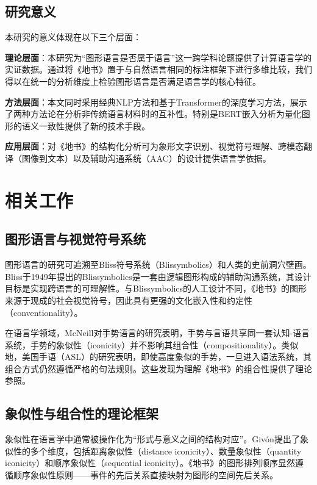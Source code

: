 \documentclass[a4paper,12pt]{article}
\begin{document}
\subsection{研究意义}

本研究的意义体现在以下三个层面：

\textbf{理论层面}：本研究为``图形语言是否属于语言''这一跨学科论题提供了计算语言学的实证数据。通过将《地书》置于与自然语言相同的标注框架下进行多维比较，我们得以在统一的分析维度上检验图形语言是否满足语言学的核心特征。

\textbf{方法层面}：本文同时采用经典NLP方法和基于Transformer的深度学习方法，展示了两种方法论在分析非传统语言材料时的互补性。特别是BERT嵌入分析为量化图形的语义一致性提供了新的技术手段。

\textbf{应用层面}：对《地书》的结构化分析可为象形文字识别、视觉符号理解、跨模态翻译（图像到文本）以及辅助沟通系统（AAC）的设计提供语言学依据。

\section{相关工作}\label{sec:related}

\subsection{图形语言与视觉符号系统}

图形语言的研究可追溯至Bliss符号系统（Blissymbolics）和人类的史前洞穴壁画。Bliss于1949年提出的Blissymbolics是一套由逻辑图形构成的辅助沟通系统，其设计目标是实现跨语言的可理解性\cite{bliss1965}。与Blissymbolics的人工设计不同，《地书》的图形来源于现成的社会视觉符号，因此具有更强的文化嵌入性和约定性（conventionality）。

在语言学领域，McNeill\cite{mcneill1992}对手势语言的研究表明，手势与言语共享同一套认知-语言系统，手势的象似性（iconicity）并不影响其组合性（compositionality）。类似地，美国手语（ASL）的研究表明，即使高度象似的手势，一旦进入语法系统，其组合方式仍然遵循严格的句法规则\cite{klima1979}。这些发现为理解《地书》的组合性提供了理论参照。

\subsection{象似性与组合性的理论框架}

象似性在语言学中通常被操作化为``形式与意义之间的结构对应''\cite{haiman1985}。Givón\cite{givon1985}提出了象似性的多个维度，包括距离象似性（distance iconicity）、数量象似性（quantity iconicity）和顺序象似性（sequential iconicity）。《地书》的图形排列顺序显然遵循顺序象似性原则——事件的先后关系直接映射为图形的空间先后关系。
\end{document}
